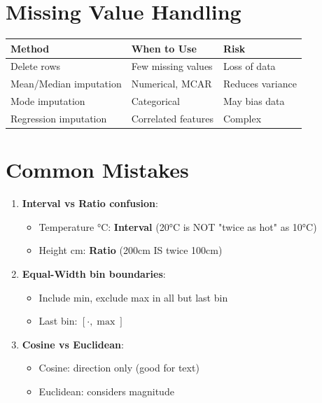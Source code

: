 \section{Missing Value Handling}

\begin{center}
\begin{tabular}{lll}
\toprule
\textbf{Method} & \textbf{When to Use} & \textbf{Risk} \\
\midrule
Delete rows & Few missing values & Loss of data \\
Mean/Median imputation & Numerical, MCAR & Reduces variance \\
Mode imputation & Categorical & May bias data \\
Regression imputation & Correlated features & Complex \\
\bottomrule
\end{tabular}
\end{center}

\section{Common Mistakes}

\begin{warningbox}
\begin{enumerate}
    \item \textbf{Interval vs Ratio confusion}:
    \begin{itemize}
        \item Temperature °C: \textbf{Interval} (20°C is NOT "twice as hot" as 10°C)
        \item Height cm: \textbf{Ratio} (200cm IS twice 100cm)
    \end{itemize}

    \item \textbf{Equal-Width bin boundaries}:
    \begin{itemize}
        \item Include min, exclude max in all but last bin
        \item Last bin: $[\cdot, \max]$
    \end{itemize}

    \item \textbf{Cosine vs Euclidean}:
    \begin{itemize}
        \item Cosine: direction only (good for text)
        \item Euclidean: considers magnitude
    \end{itemize}
\end{enumerate}
\end{warningbox}

